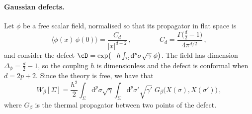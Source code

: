 \documentclass[a4paper,11pt]{article}
\newcommand{\dd}{\mathrm{d}}
\begin{document}
	\paragraph{Gaussian defects.}
	Let $\phi$ be a free scalar field, normalised so that its propagator in flat space is
	\begin{equation}\label{eq:Gflat}
		\langle\phi(x)\,\phi(0)\rangle=\frac{C_d}{|x|^{d-2}}\, ,\qquad\qquad C_d=\frac{\Gamma\bigl(\frac d2-1\bigr)}{4\pi^{d/2}}\, ,
	\end{equation}
	and consider the defect $\cD=\exp\bigl(-h\int_\Sigma\dd^p\sigma\sqrt\gamma\;\phi\bigr)$. The field has dimension $\Delta_\phi=\tfrac d2-1$, so the coupling $h$ is dimensionless and the defect is conformal when $d=2p+2$. Since the theory is free, we have that 
	\begin{equation}\label{eq:Wgauss}
		W_\beta[\Sigma]=\frac{h^2}{2}\int_\Sigma\dd^p\sigma\sqrt\gamma\int_\Sigma\dd^p\sigma'\sqrt{\gamma'}\;G_\beta\bigl(X(\sigma),X(\sigma')\bigr)\, ,
	\end{equation}
	where $G_\beta$ is the thermal propagator between two points of the defect.
	
\end{document}
